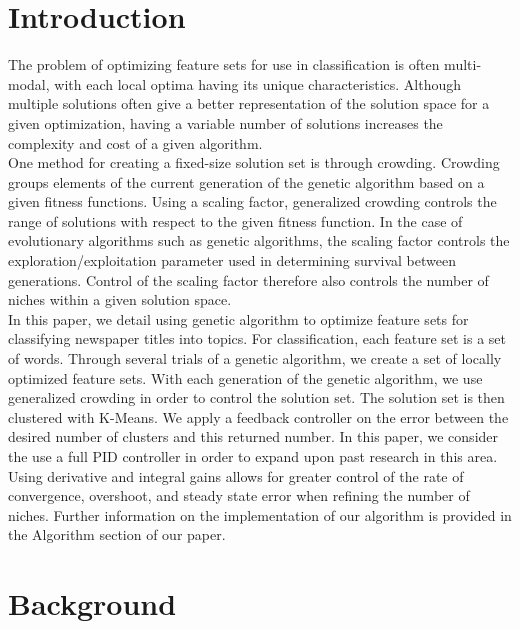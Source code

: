 \documentclass{sig-alternate}
\begin{document}


\section{Introduction}
The problem of optimizing feature sets for use in classification is often multi-modal, with each local optima having its unique characteristics. Although multiple solutions often give a better representation of the solution space for a given optimization, having a variable number of solutions increases the complexity and cost of a given algorithm.\\
\indent One method for creating a fixed-size solution set is through crowding. Crowding groups elements of the current generation of the genetic algorithm based on a given fitness functions\cite{ole:feedback}. Using a scaling factor, generalized crowding controls the range of solutions  with respect to the given fitness function. In the case of evolutionary algorithms such as genetic algorithms, the scaling factor controls the exploration/exploitation parameter used in determining survival between generations. Control of the scaling factor therefore also controls the number of niches within a given solution space\cite{ole:feedback}.\\
\indent In this paper, we detail using genetic algorithm to optimize feature sets for classifying newspaper titles into topics. For classification, each feature set is a set of words. Through several trials of a genetic algorithm, we create a set of locally optimized feature sets. With each generation of the genetic algorithm, we use generalized crowding in order to control the solution set. The solution set is then clustered with K-Means. We apply a feedback controller on the error between the desired number of clusters and this returned number. In this paper, we consider the use a full PID controller in order to expand upon past research in this area. Using derivative and integral gains allows for greater control of the rate of convergence, overshoot, and steady state error when refining the number of  niches. Further information on the implementation of our algorithm is provided in the Algorithm section of our paper.  

\section{Background}
\end{document}

